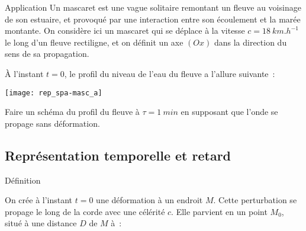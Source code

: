 \documentclass[../main/main.tex]{subfiles}
\begin{document}
\begin{rexem}{Application}
    Un mascaret est une vague solitaire remontant un fleuve au voisinage de son
    estuaire, et provoqué par une interaction entre son écoulement et la marée
    montante. On considère ici un mascaret qui se déplace à la vitesse $c =
    \SI{18}{km.h^{-1}}$ le long d'un fleuve rectiligne, et on définit un axe
    $(Ox)$ dans la direction du sens de sa propagation.

    À l'instant $t=0$, le profil du niveau de l'eau du fleuve a l'allure
    suivante~:
    \begin{center}
        \texttt{[image: rep\_spa-masc\_a]}
    \end{center}
    Faire un schéma du profil du fleuve à $\tau = \SI{1}{min}$ en supposant que
    l'onde se propage sans déformation.
    {\vspace{2cm}}
\end{rexem}

\subsection{Représentation temporelle et retard}

\begin{rdefi}{\tiny Définition}
\end{rdefi}

On crée à l’instant $t = 0$ une déformation à un endroit $M$. Cette perturbation se
propage le long de la corde avec une célérité $c$. Elle parvient en un point
$M_0$, situé à une distance $D$ de $M$ à~:
\end{document}
